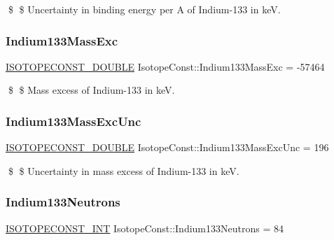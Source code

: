 \$ \$ Uncertainty in binding energy per A of Indium-\/133 in keV. \mbox{\label{group___isotope_const-_indium-_in133_ga33be811d44b0020608ce585aed8cd774}} 
\subsubsection{\texorpdfstring{Indium133\+Mass\+Exc}{Indium133MassExc}}
{\footnotesize\ttfamily \mbox{\hyperlink{group___isotope_const-_macros_ga8f45a7272ce02c0b4c65c44636ed719a}{I\+S\+O\+T\+O\+P\+E\+C\+O\+N\+S\+T\+\_\+\+D\+O\+U\+B\+LE}} Isotope\+Const\+::\+Indium133\+Mass\+Exc = -\/57464}

\$ \$ Mass excess of Indium-\/133 in keV. \mbox{\label{group___isotope_const-_indium-_in133_gaca7c8255544f14d36be2b13a2c8c8267}} 
\subsubsection{\texorpdfstring{Indium133\+Mass\+Exc\+Unc}{Indium133MassExcUnc}}
{\footnotesize\ttfamily \mbox{\hyperlink{group___isotope_const-_macros_ga8f45a7272ce02c0b4c65c44636ed719a}{I\+S\+O\+T\+O\+P\+E\+C\+O\+N\+S\+T\+\_\+\+D\+O\+U\+B\+LE}} Isotope\+Const\+::\+Indium133\+Mass\+Exc\+Unc = 196}

\$ \$ Uncertainty in mass excess of Indium-\/133 in keV. \mbox{\label{group___isotope_const-_indium-_in133_ga2d4531c74689f62eb3b1f7914b56fffa}} 
\subsubsection{\texorpdfstring{Indium133\+Neutrons}{Indium133Neutrons}}
{\footnotesize\ttfamily \mbox{\hyperlink{group___isotope_const-_macros_ga5f18360b3e99483a35c32d789e62621c}{I\+S\+O\+T\+O\+P\+E\+C\+O\+N\+S\+T\+\_\+\+I\+NT}} Isotope\+Const\+::\+Indium133\+Neutrons = 84}


